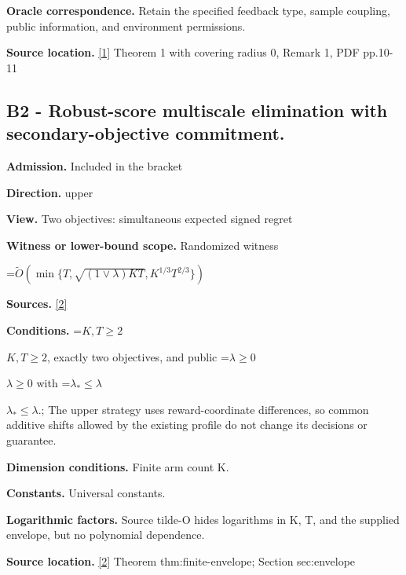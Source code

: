 \documentclass[10pt,a4paper]{article}
\newcommand{\AtlasMath}[1]{\par\begingroup\centering\setbox0=\hbox{$\displaystyle #1$}\ifdim\wd0>1.4\linewidth\typeout{ATLAS WIDE FORMULA: \the\wd0}\fi\ifdim\wd0>\linewidth\resizebox{\linewidth}{!}{\box0}\else\box0\fi\par\endgroup}
\newcommand{\AtlasInlineMath}[1]{\begingroup\setbox0=\hbox{$#1$}\ifdim\wd0>.4\linewidth\endgroup\AtlasMath{#1}\else\endgroup$#1$\fi}
\begin{document}
\textbf{Oracle correspondence.} Retain the specified feedback type, sample coupling, public information, and environment permissions.



\textbf{Source location.} \href{https://jmlr.org/papers/volume26/24-1047/24-1047.pdf}{[1]} Theorem 1 with covering radius 0, Remark 1, PDF pp.10-11



\subsection{B2 - Robust-score multiscale elimination with secondary-objective commitment.}


\textbf{Admission.} Included in the bracket



\textbf{Direction.} upper



\textbf{View.} Two objectives: simultaneous expected signed regret



\textbf{Witness or lower-bound scope.} Randomized witness



\AtlasMath{\widetilde O\!\left(\min\{T,\sqrt{(1\vee\lambda)KT},K^{1/3}T^{2/3}\}\right)}


\textbf{Sources.} \href{https://github.com/WU-Wendao/Colombo/blob/main/colombo_sensorium/Complexity_altas/data/sources/colombo/U07/manuscript.pdf}{[2]}



\textbf{Conditions.} \AtlasInlineMath{K,T\ge2}, exactly two objectives, and public \AtlasInlineMath{\lambda\ge0} with \AtlasInlineMath{\lambda_*\le\lambda}.; The upper strategy uses reward-coordinate differences, so common additive shifts allowed by the existing profile do not change its decisions or guarantee.



\textbf{Dimension conditions.} Finite arm count K.



\textbf{Constants.} Universal constants.



\textbf{Logarithmic factors.} Source tilde-O hides logarithms in K, T, and the supplied envelope, but no polynomial dependence.



\textbf{Source location.} \href{https://github.com/WU-Wendao/Colombo/blob/main/colombo_sensorium/Complexity_altas/data/sources/colombo/U07/manuscript.pdf}{[2]} Theorem thm:finite-envelope; Section sec:envelope
\end{document}
